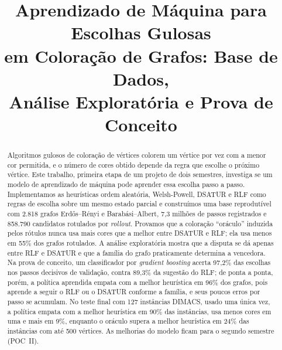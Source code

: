 \documentclass[conference,a4paper]{IEEEtran}
\begin{document}
\title{Aprendizado de Máquina para Escolhas Gulosas\\em Coloração de Grafos: Base de Dados,\\Análise Exploratória e Prova de Conceito}

\author{
\and
{}
}

\maketitle

\begin{abstract}
Algoritmos gulosos de coloração de vértices colorem um vértice por vez com a menor cor
permitida, e o número de cores obtido depende da regra que escolhe o próximo vértice. Este
trabalho, primeira etapa de um projeto de dois semestres, investiga se um modelo de
aprendizado de máquina pode aprender essa escolha passo a passo. Implementamos as heurísticas
ordem aleatória, Welsh-Powell, DSATUR e RLF como regras de escolha sobre um mesmo estado
parcial e construímos uma base reprodutível com 2.818 grafos Erdős–Rényi e Barabási–Albert,
7,3 milhões de passos registrados e 858.790 candidatos rotulados por \emph{rollout}. Provamos
que a coloração ``oráculo'' induzida pelos rótulos nunca usa mais cores que a melhor entre
DSATUR e RLF; ela usa menos em 55\% dos grafos rotulados. A análise exploratória mostra que a
disputa se dá apenas entre RLF e DSATUR e que a família do grafo praticamente determina a
vencedora. Na prova de conceito, um classificador por \emph{gradient boosting} acerta 97,2\% das
escolhas nos passos decisivos de validação, contra 89,3\% da sugestão do RLF; de ponta a ponta,
porém, a política aprendida empata com a melhor heurística em 96\% dos grafos, pois aprende a
seguir o RLF ou o DSATUR conforme a família, e seus poucos erros por passo se acumulam. No teste
final com 127 instâncias DIMACS, usado uma única vez, a política empata com a melhor heurística
em 90\% das instâncias, usa menos cores em uma e mais em 9\%, enquanto o oráculo supera a
melhor heurística em 24\% das instâncias com até 500 vértices. As melhorias do modelo ficam
para o segundo semestre (POC~II).
\end{abstract}
\end{document}
